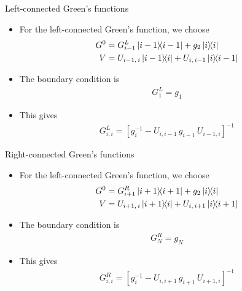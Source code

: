\documentclass[usenames,dvipsnames]{beamer}
\begin{document}
\begin{frame}{Left-connected Green's functions}
	\begin{itemize}
		\item {For the left-connected Green's function, we choose
			\begin{align}
			G^{0} &= G^{L}_{i-1}\ketbra{i-1}{i-1} + g_2 \ketbra{i}{i}\\
			V &= U_{i-1,\,i}\ketbra{i-1}{i} + U_{i,\,i-1}\ketbra{i}{i-1}
			\end{align}}
		\item {
			The boundary condition is
			\begin{align}
			G^{L}_{1} = g_{1}
			\end{align}
			}
			\item {
				This gives
				\begin{align}
				G^{L}_{i,i} = \left[ g^{-1}_i - U_{i,i-1}\,g_{i-1}\,U_{i-1,i}  \right]^{-1}
				\end{align}
			}
	\end{itemize}
\end{frame}

\begin{frame}{Right-connected Green's functions}
	\begin{itemize}
		\item {For the left-connected Green's function, we choose
			\begin{align}
			G^{0} &= G^{R}_{i+1}\ketbra{i+1}{i+1} + g_2 \ketbra{i}{i}\\
			V &= U_{i+1,\,i}\ketbra{i+1}{i} + U_{i,\,i+1}\ketbra{i}{i+1}
			\end{align}}
		\item {
			The boundary condition is
			\begin{align}
			G^{R}_{N} = g_{N}
			\end{align}
		}
		\item {
			This gives
			\begin{align}
			G^{R}_{i,i} = \left[ g^{-1}_i - U_{i,i+1}\,g_{i+1}\,U_{i+1,i}  \right]^{-1}
			\end{align}
		}
	\end{itemize}
\end{frame}
\end{document}
